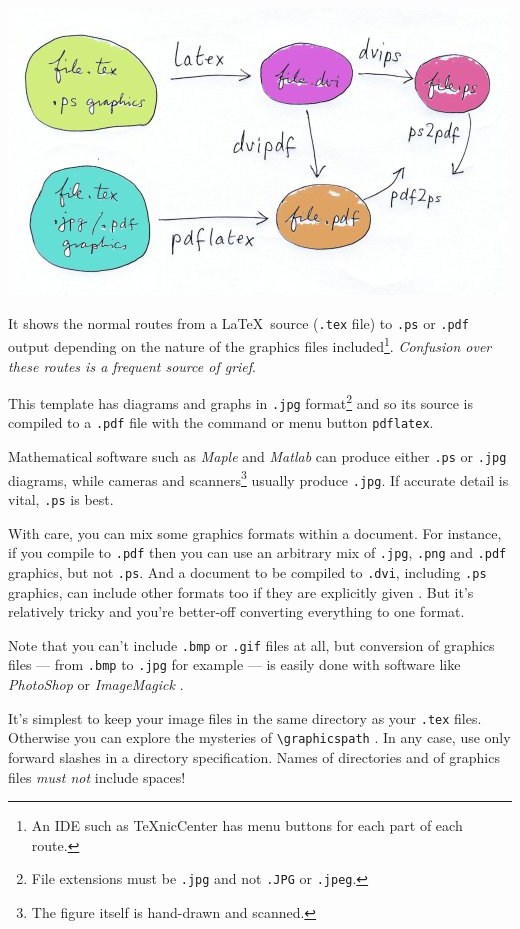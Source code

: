 \begin{center}
\includegraphics[width=.7\textwidth]{pic1.jpg}
\end{center}
It shows the normal routes from a \LaTeX\ source (\texttt{.tex} file) to
\texttt{.ps} or \texttt{.pdf} output depending on the nature of the
graphics files included\footnote{An IDE such as TeXnicCenter has menu
buttons for each part of each route.}. \textit{Confusion over these
routes is a frequent source of grief}.
\par
This template has diagrams and graphs in \texttt{.jpg}
format\footnote{File extensions must be \texttt{.jpg} and not
\texttt{.JPG} or \texttt{.jpeg}.} and so its source is compiled to a
\texttt{.pdf} file with the command or menu button \texttt{pdflatex}.
\par
Mathematical software such as \textsl{Maple} and \textsl{Matlab} can
produce either \texttt{.ps} or \texttt{.jpg} diagrams, while cameras and
scanners\footnote{The figure itself is hand-drawn and scanned.} usually
produce \texttt{.jpg}. If accurate detail is vital, \texttt{.ps} is
best.
\par
With care, you can mix some graphics formats within a document. For
instance, if you compile to \texttt{.pdf} then you can use an
arbitrary mix of \texttt{.jpg}, \texttt{.png} and \texttt{.pdf}
graphics, but not \texttt{.ps}. And a document to be compiled to
\texttt{.dvi}, including \texttt{.ps} graphics, can include other
formats too if they are explicitly given . But
it's relatively tricky and you're better-off converting everything to
one format.
\par
Note that you can't include \texttt{.bmp} or \texttt{.gif} files at
all, but conversion of graphics files --- from \texttt{.bmp} to
\texttt{.jpg} for example --- is easily done with software like
\textsl{PhotoShop} \cite{PS} or \textsl{ImageMagick} \cite{IM}.
\par
It's simplest to keep your image files in the same directory as your
\texttt{.tex} files. Otherwise you can explore the mysteries of
\verb+\graphicspath+ \cite[Sec.~10.2.5]{MG}. In any case, use only
forward slashes in a directory specification. Names of directories and
of graphics files \textit{must not} include spaces!
%
